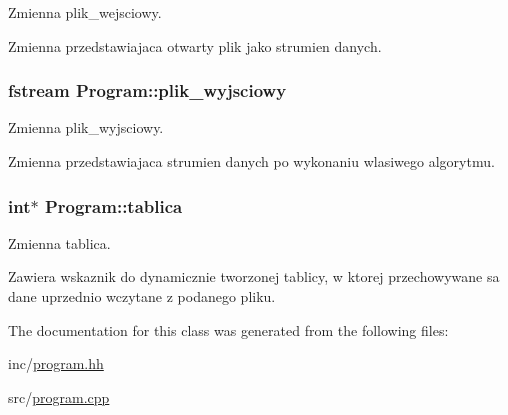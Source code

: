 Zmienna plik\-\_\-wejsciowy. 

Zmienna przedstawiajaca otwarty plik jako strumien danych. \hypertarget{class_program_aaa305591a4333d799c8d353f3072d8e0}{
\subsubsection[{plik\-\_\-wyjsciowy}]{\setlength{\rightskip}{0pt plus 5cm}fstream Program\-::plik\-\_\-wyjsciowy}}\label{class_program_aaa305591a4333d799c8d353f3072d8e0}


Zmienna plik\-\_\-wyjsciowy. 

Zmienna przedstawiajaca strumien danych po wykonaniu wlasiwego algorytmu. \hypertarget{class_program_ad716e08410eb11cfd01ece6c459c1de1}{
\subsubsection[{tablica}]{\setlength{\rightskip}{0pt plus 5cm}int$\ast$ Program\-::tablica}}\label{class_program_ad716e08410eb11cfd01ece6c459c1de1}


Zmienna tablica. 

Zawiera wskaznik do dynamicznie tworzonej tablicy, w ktorej przechowywane sa dane uprzednio wczytane z podanego pliku. 

The documentation for this class was generated from the following files\-:\begin{DoxyCompactItemize}
\item 
inc/\hyperlink{program_8hh}{program.\-hh}\item 
src/\hyperlink{program_8cpp}{program.\-cpp}\end{DoxyCompactItemize}
